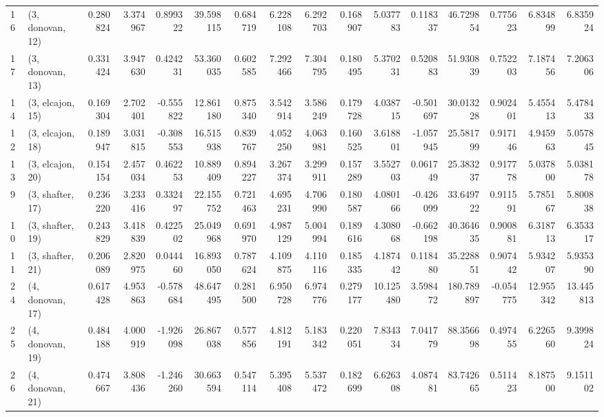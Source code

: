 \begin{tabular}{llrrrrrrrrrrrrrr}
16 &  (3, donovan, 12) &   0.280824 &  3.374967 &  0.899322 &  39.598115 &  0.684719 &   6.228108 &  6.292703 &  0.168907 &   5.037783 &  0.118337 &   46.729854 &  0.775623 &   6.834899 &   6.835924 \\
17 &  (3, donovan, 13) &   0.331424 &  3.947630 &  0.424231 &  53.360035 &  0.602585 &   7.292466 &  7.304795 &  0.180495 &   5.370231 &  0.520883 &   51.930839 &  0.752203 &   7.187456 &   7.206306 \\
14 &  (3, elcajon, 15) &   0.169304 &  2.702401 & -0.555822 &  12.861180 &  0.875340 &   3.542914 &  3.586249 &  0.179728 &   4.038715 & -0.501697 &   30.013228 &  0.902401 &   5.455413 &   5.478433 \\
12 &  (3, elcajon, 18) &   0.189947 &  3.031815 & -0.308553 &  16.515938 &  0.839767 &   4.052250 &  4.063981 &  0.160525 &   3.618801 & -1.057945 &   25.581799 &  0.917146 &   4.945963 &   5.057845 \\
13 &  (3, elcajon, 20) &   0.154154 &  2.457034 &  0.462253 &  10.889409 &  0.894227 &   3.267374 &  3.299911 &  0.157289 &   3.552703 &  0.061749 &   25.383237 &  0.917778 &   5.037800 &   5.038178 \\
9  &  (3, shafter, 17) &   0.236220 &  3.233416 &  0.332497 &  22.155752 &  0.721463 &   4.695231 &  4.706990 &  0.180587 &   4.080166 & -0.426099 &   33.649722 &  0.911591 &   5.785167 &   5.800838 \\
10 &  (3, shafter, 19) &   0.243829 &  3.418839 &  0.422502 &  25.049968 &  0.691970 &   4.987129 &  5.004994 &  0.189616 &   4.308068 & -0.662198 &   40.364635 &  0.900881 &   6.318713 &   6.353317 \\
11 &  (3, shafter, 21) &   0.206089 &  2.820975 &  0.044460 &  16.893050 &  0.787624 &   4.109875 &  4.110116 &  0.185335 &   4.187442 &  0.118480 &   35.228851 &  0.907442 &   5.934207 &   5.935390 \\
24 &  (4, donovan, 17) &   0.617428 &  4.953863 & -0.578684 &  48.647495 &  0.281500 &   6.950728 &  6.974776 &  0.279177 &  10.125480 &  3.598472 &  180.789897 & -0.054775 &  12.955342 &  13.445813 \\
25 &  (4, donovan, 19) &   0.484188 &  4.000919 & -1.926098 &  26.867038 &  0.577856 &   4.812191 &  5.183342 &  0.220051 &   7.834334 &  7.041779 &   88.356698 &  0.497455 &   6.226560 &   9.399824 \\
26 &  (4, donovan, 21) &   0.474667 &  3.808436 & -1.246260 &  30.663594 &  0.547114 &   5.395408 &  5.537472 &  0.182699 &   6.626308 &  4.087481 &   83.742665 &  0.511423 &   8.187500 &   9.151102 \\

\end{tabular}
